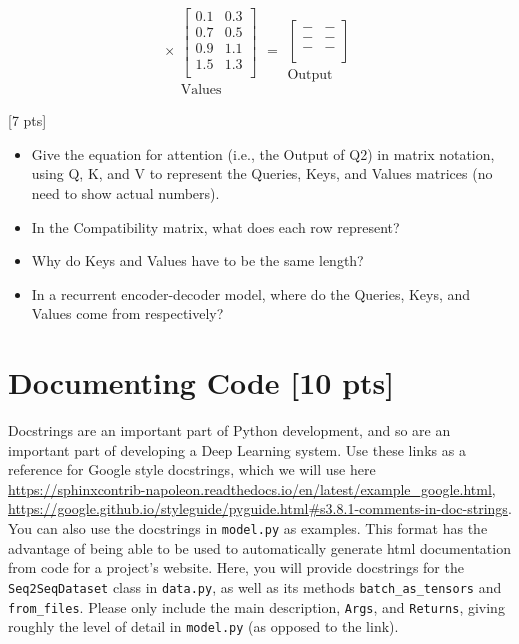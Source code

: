 \documentclass[11pt]{article}
\begin{document}
\[
\times
\begin{array}{c}
\begin{bmatrix}
0.1 & 0.3 \\
0.7 & 0.5 \\
0.9 & 1.1 \\
1.5 & 1.3 \\
\end{bmatrix}\\
\text{Values}
\end{array}
=
\begin{array}{c}
\begin{bmatrix}
- & - \\
- & - \\
- & - \\
\end{bmatrix}\\
\text{Output}
\end{array}
\]

\newpage
{} \hfill [7 pts]
\begin{itemize}
  \item Give the equation for attention (i.e., the Output of Q2) in matrix notation, using Q, K, and V to represent the Queries, Keys, and Values matrices (no need to show actual numbers).
  \item In the Compatibility matrix, what does each row represent?
  \item Why do Keys and Values have to be the same length?
  \item In a recurrent encoder-decoder model, where do the Queries, Keys, and Values come from respectively?
\end{itemize}

\section{Documenting Code [10 pts]}

Docstrings are an important part of Python development, and so are an important part of developing a Deep Learning system. Use these links as a reference for Google style docstrings, which we will use here \url{https://sphinxcontrib-napoleon.readthedocs.io/en/latest/example_google.html}, \url{https://google.github.io/styleguide/pyguide.html#s3.8.1-comments-in-doc-strings}. You can also use the docstrings in \texttt{model.py} as examples. This format has the advantage of being able to be used to automatically generate html documentation from code for a project's website. Here, you will provide docstrings for the \texttt{Seq2SeqDataset} class in \texttt{data.py}, as well as its methods \texttt{batch\_as\_tensors} and \texttt{from\_files}. Please only include the main description, \texttt{Args}, and \texttt{Returns}, giving roughly the level of detail in \texttt{model.py} (as opposed to the link).
\end{document}
